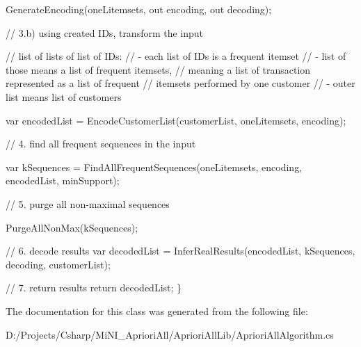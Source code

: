 \begin{DoxyCode}
            GenerateEncoding(oneLitemsets, out encoding, out decoding);

            \textcolor{comment}{// 3.b) using created IDs, transform the input}

            \textcolor{comment}{// list of lists of list of IDs:}
            \textcolor{comment}{// - each list of IDs is a frequent itemset}
            \textcolor{comment}{// - list of those means a list of frequent itemsets, }
            \textcolor{comment}{//   meaning a list of transaction represented as a list of
       frequent }
            \textcolor{comment}{//   itemsets performed by one customer}
            \textcolor{comment}{// - outer list means list of customers}

            var encodedList = EncodeCustomerList(customerList, oneLitemsets, 
      encoding);

            \textcolor{comment}{// 4. find all frequent sequences in the input}

            var kSequences = FindAllFrequentSequences(oneLitemsets, encoding, 
      encodedList, minSupport);

            \textcolor{comment}{// 5. purge all non-maximal sequences}

            PurgeAllNonMax(kSequences);

            \textcolor{comment}{// 6. decode results}
            var decodedList = InferRealResults(encodedList, kSequences, 
      decoding, customerList);

            \textcolor{comment}{// 7. return results}
            \textcolor{keywordflow}{return} decodedList;
        \}
\end{DoxyCode}


The documentation for this class was generated from the following file\-:\begin{DoxyCompactItemize}
\item 
D\-:/\-Projects/\-Csharp/\-Mi\-N\-I\-\_\-\-Apriori\-All/\-Apriori\-All\-Lib/Apriori\-All\-Algorithm.\-cs\end{DoxyCompactItemize}
